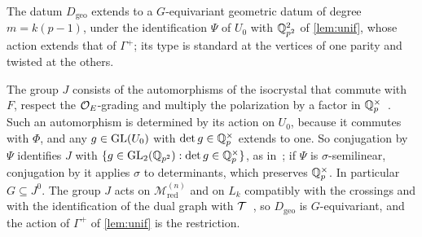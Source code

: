 \begin{lemma}\label{lem:geo}
\notformalized
The datum $D_{\mathrm{geo}}$ extends to a $G$-equivariant geometric datum of degree $m=k(p-1)$, under the identification
$\Psi$ of $U_0$ with $\mathbb{Q}_{p^2}^2$ of \cref{lem:unif}, whose action extends that of $\Gamma^+$; its type is standard at the
vertices of one parity and twisted at the others.
\end{lemma}
\begin{informalproof}
The group $J$ consists of the automorphisms of the isocrystal that commute with $F$, respect the $\mathcal{O}_E$-grading and
multiply the polarization by a factor in $\mathbb{Q}_p^\times$~\cite[(4.5)]{KudlaRapoport1999}. Such an automorphism is determined
by its action on $U_0$, because it commutes with $\Phi$, and any $g\in\operatorname{GL}(U_0)$ with $\det g\in\mathbb{Q}_p^\times$ extends to
one. So conjugation by $\Psi$ identifies $J$ with $\{g\in\operatorname{GL}_2(\mathbb{Q}_{p^2}):\det g\in\mathbb{Q}_p^\times\}$, as
in~\cite[(5.12)]{KudlaRapoport1999}; if $\Psi$ is $\sigma$-semilinear, conjugation by it applies $\sigma$ to determinants,
which preserves $\mathbb{Q}_p^\times$. In particular $G\subseteq J^0$. The group $J$
acts on $\mathcal M^{(n)}_{\mathrm{red}}$ and on $L_k$ compatibly with the crossings and with the identification of the dual
graph with $\mathcal{T}$~\cite[Section~6.3]{Luck2026}, so $D_{\mathrm{geo}}$ is $G$-equivariant, and the action of $\Gamma^+$ of
\cref{lem:unif} is the restriction.


\end{informalproof}
